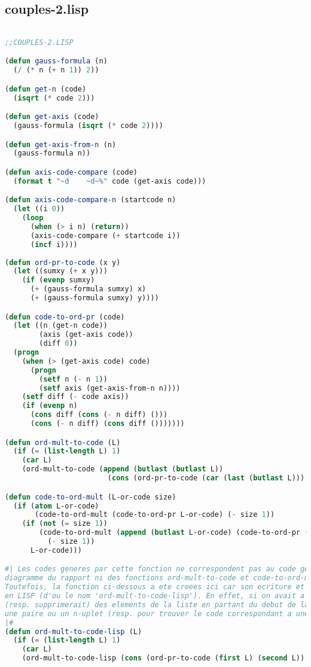 \documentclass{article}
\begin{document}
\subsection{couples-2.lisp}
\label{couples2lisp}
\begin{lstlisting}[language=Lisp]

;;COUPLES-2.LISP

(defun gauss-formula (n)
  (/ (* n (+ n 1)) 2))

(defun get-n (code)
  (isqrt (* code 2)))

(defun get-axis (code)
  (gauss-formula (isqrt (* code 2))))

(defun get-axis-from-n (n)
  (gauss-formula n))

(defun axis-code-compare (code)
  (format t "~d    ~d~%" code (get-axis code))) 

(defun axis-code-compare-n (startcode n)
  (let ((i 0))
    (loop
      (when (> i n) (return))
      (axis-code-compare (+ startcode i))
      (incf i))))
  
(defun ord-pr-to-code (x y)
  (let ((sumxy (+ x y)))
    (if (evenp sumxy)
      (+ (gauss-formula sumxy) x)
      (+ (gauss-formula sumxy) y))))

(defun code-to-ord-pr (code)
  (let ((n (get-n code))
        (axis (get-axis code))
        (diff 0))
  (progn
    (when (> (get-axis code) code)
      (progn
        (setf n (- n 1))
        (setf axis (get-axis-from-n n))))
    (setf diff (- code axis))
    (if (evenp n)
      (cons diff (cons (- n diff) ()))
      (cons (- n diff) (cons diff ()))))))

(defun ord-mult-to-code (L)
  (if (= (list-length L) 1)
    (car L)
    (ord-mult-to-code (append (butlast (butlast L)) 
                        (cons (ord-pr-to-code (car (last (butlast L))) (car (last L))) ())))))

(defun code-to-ord-mult (L-or-code size)
  (if (atom L-or-code)
       (code-to-ord-mult (code-to-ord-pr L-or-code) (- size 1))
    (if (not (= size 1))
        (code-to-ord-mult (append (butlast L-or-code) (code-to-ord-pr (car (last L-or-code))))
          (- size 1))
      L-or-code)))

#| Les codes generes par cette fonction ne correspondent pas au code genere par le
diagramme du rapport ni des fonctions ord-mult-to-code et code-to-ord-mult. 
Toutefois, la fonction ci-dessous a ete creees ici car son ecriture et beaucoup plus idiomatique
en LISP (d'ou le nom 'ord-mult-to-code-lisp'). En effet, si on avait a coder les nombres naturels en LISP, on ajouterait 
(resp. supprimerait) des elements de la liste en partant du debut de la liste afin de creer
une paire ou un n-uplet (resp. pour trouver le code correspondant a une paire ou un n-uplet
|#
(defun ord-mult-to-code-lisp (L)
  (if (= (list-length L) 1)
    (car L)
    (ord-mult-to-code-lisp (cons (ord-pr-to-code (first L) (second L)) (cddr L)))))


\end{lstlisting}
\end{document}
